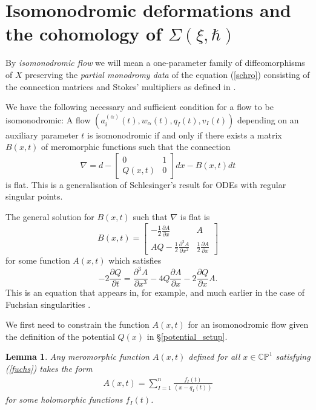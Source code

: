 \documentclass[a4paper,12pt,reqno]{amsart}
\newcounter{counter2}
\numberwithin{equation}{section}
\numberwithin{counter2}{section}
\newcounter{counter3}
\newtheorem{lemma}[counter2]{Lemma}
\begin{document}
\section{Isomonodromic deformations and the cohomology of $\Sigma(\xi,\hbar)$} \label{curve_approach}
By \textit{isomonodromic flow} we will mean a one-parameter family of diffeomorphisms of $X$ preserving the \textit{partial monodromy data} of the equation (\ref{schro}) consisting of the connection matrices and Stokes' multipliers as defined in \cite{M}.  \par We have the following necessary and sufficient condition for a flow to be isomonodromic:
 A flow $(a_{i}^{(\alpha)}(t),w_\alpha(t),  q_I(t),  v_I(t))$ depending  on an auxiliary parameter $t$ is isomonodromic if and only if there exists a matrix $B(x,t)$ of meromorphic functions such that the connection
\begin{equation*}
\nabla = d - \begin{bmatrix} 0 & 1 \\ Q(x,t) & 0 \end{bmatrix} dx - B(x,t)dt 
\end{equation*}
is flat.   This  is a generalisation \cite{U,  JMU} of Schlesinger's result for ODEs with regular singular points. \par  The general solution for  $B(x,t)$ such that $\nabla$ is flat is
\renewcommand*{\arraystretch}{1.5}
\begin{equation*}
B(x,t) =  \begin{bmatrix} -\frac{1}{2}\frac{\partial A}{\partial x} & A \\  AQ -  \frac{1}{2}\frac{\partial^2A }{\partial x^2} & \frac{1}{2}\frac{\partial A}{\partial x} \end{bmatrix} 
\end{equation*}
for some function $A(x,t)$ which satisfies
\begin{equation}\label{fuchs}
-2\frac{\partial Q}{\partial t} = \frac{\partial^3 A}{\partial x^3} - 4Q\frac{\partial A}{\partial x} - 2\frac{\partial Q}{\partial x}A.  
\end{equation}
This is an equation that appears in,  for example,  \cite{BM} and much earlier in the case of Fuchsian singularities \cite{F}.  \par 
We first need to constrain the function $A(x,t)$ for an isomonodromic flow given the definition of the potential $Q(x)$ in \S \ref{potential_setup}.  \begin{lemma}\label{ansatz}
Any meromorphic function $A(x,t)$ defined for all $x \in \mathbb{CP}^1$ satisfying \rm{(\ref{fuchs})} takes the form
\begin{align}\label{A_ansatz}
A(x,t) = \sum_{I=1}^{n} \frac{f_I(t)}{(x-q_I(t))}
\end{align}
for some holomorphic functions $f_I(t)$.  
\end{lemma}
\end{document}
